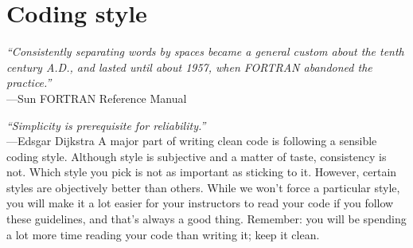 \documentclass[openany,oneside]{report}
\renewenvironment{quote}{\list{}{\leftmargin=8\parindent}\item\relax}{\endlist}
\begin{document}
\chapter{Coding style}
\label{chap:Coding style}

\begin{quote}\small
  \emph{``Consistently separating words by spaces became a general custom about the tenth century A.D., and lasted until about 1957, when FORTRAN abandoned the practice.''} \\ \hspace*{\fill}---Sun FORTRAN Reference Manual
\end{quote}

\begin{quote}\small
  \emph{``Simplicity is prerequisite for reliability.''} \\ \hspace*{\fill}---Edsgar Dijkstra
\end{quote}
A major part of writing clean code is following a sensible coding style.
Although style is subjective and a matter of taste, consistency is not.
Which style you pick is not as important as sticking to it.
However, certain styles are objectively better than others.
While we won't force a particular style, you will make it a lot easier for your instructors to read your code if you follow these guidelines, and that's always a good thing.
Remember: you will be spending a lot more time reading your code than writing it; keep it clean.
\end{document}
